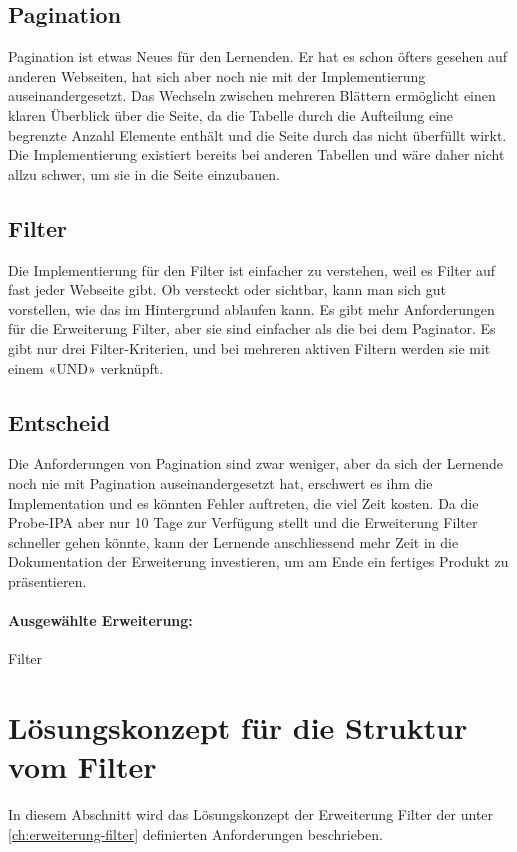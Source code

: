 \subsection{Pagination}
Pagination ist etwas Neues für den Lernenden. Er hat es schon öfters gesehen auf anderen Webseiten, hat sich aber noch nie mit der Implementierung auseinandergesetzt. Das Wechseln zwischen mehreren Blättern ermöglicht einen klaren Überblick über die Seite, da die Tabelle durch die Aufteilung eine begrenzte Anzahl Elemente enthält und die Seite durch das nicht überfüllt wirkt. Die Implementierung existiert bereits bei anderen Tabellen und wäre daher nicht allzu schwer, um sie in die Seite einzubauen.

\subsection{Filter}
Die Implementierung für den Filter ist einfacher zu verstehen, weil es Filter auf fast jeder Webseite gibt. Ob versteckt oder sichtbar, kann man sich gut vorstellen, wie das im Hintergrund ablaufen kann. Es gibt mehr Anforderungen für die Erweiterung Filter, aber sie sind einfacher als die bei dem Paginator. Es gibt nur drei Filter-Kriterien, und bei mehreren aktiven Filtern werden sie mit einem «UND» verknüpft.

\subsection{Entscheid}
Die Anforderungen von Pagination sind zwar weniger, aber da sich der Lernende noch nie mit Pagination auseinandergesetzt hat, erschwert es ihm die Implementation und es könnten Fehler auftreten, die viel Zeit kosten. Da die Probe-IPA aber nur 10 Tage zur Verfügung stellt und die Erweiterung Filter schneller gehen könnte, kann der Lernende anschliessend mehr Zeit in die Dokumentation der Erweiterung investieren, um am Ende ein fertiges Produkt zu präsentieren.
\paragraph{Ausgewählte Erweiterung:} Filter

\section{Lösungskonzept für die Struktur vom Filter}
In diesem Abschnitt wird das Lösungskonzept der Erweiterung Filter der unter \ref{ch:erweiterung-filter} definierten Anforderungen beschrieben.


